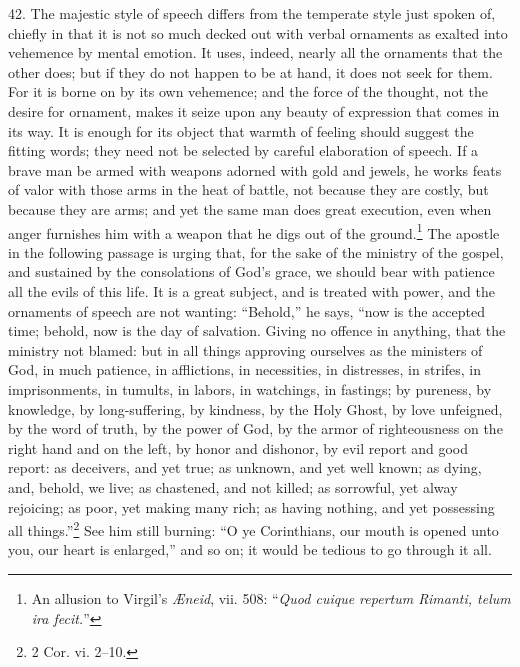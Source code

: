 42. The majestic style of speech differs from the temperate style just spoken of, chiefly in that it is not so much decked out with verbal ornaments as exalted into vehemence by mental emotion. It uses, indeed, nearly all the ornaments that the other does; but if they do not happen to be at hand, it does not seek for them. For it is borne on by its own vehemence; and the force of the thought, not the desire for ornament, makes it seize upon any beauty of expression that comes in its way. It is enough for its object that warmth of feeling should suggest the fitting words; they need not be selected by careful elaboration of speech. If a brave man be armed with weapons adorned with gold and jewels, he works feats of valor with those arms in the heat of battle, not because they are costly, but because they are arms; and yet the same man does great execution, even when anger furnishes him with a weapon that he digs out of the ground.\footnote{An allusion to Virgil’s \emph{ Æneid}, vii. 508: “\emph{Quod cuique repertum Rimanti, telum ira fecit.}”} The apostle in the following passage is urging that, for the sake of the ministry of the gospel, and sustained by the consolations of God’s grace, we should bear with patience all the evils of this life. It is a great subject, and is treated with power, and the ornaments of speech are not wanting: “Behold,” he says, “now is the accepted time; behold, now is the day of salvation. Giving no offence in anything, that the ministry not blamed: but in all things approving ourselves as the ministers of God, in much patience, in afflictions, in necessities, in distresses, in strifes, in imprisonments, in tumults, in labors, in watchings, in fastings; by pureness, by knowledge, by long-suffering, by kindness, by the Holy Ghost, by love unfeigned, by the word of truth, by the power of God, by the armor of righteousness on the right hand and on the left, by honor and dishonor, by evil report and good report: as deceivers, and yet true; as unknown, and yet well known; as dying, and, behold, we live; as chastened, and not killed; as sorrowful, yet alway rejoicing; as poor, yet making many rich; as having nothing, and yet possessing all things.”\footnote{2 Cor. vi. 2–10.} See him still burning: “O ye Corinthians, our mouth is opened unto you, our heart is enlarged,” and so on; it would be tedious to go through it all.


